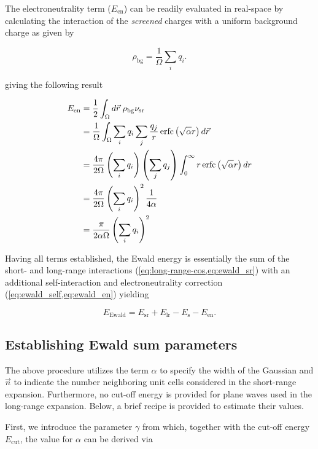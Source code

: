 The electroneutrality term ($E_{\text{en}}$) can be readily evaluated in real-space by calculating the interaction of the \textit{screened} charges with a uniform background charge as given by

\begin{equation}
    \rho_{\text{bg}} = \frac{1}{\Omega}\sum_{i} q_{i}.
\end{equation}

giving the following result

\begin{align}
    E_{\text{en}} &= \frac{1}{2} \int_{\Omega} d\vec{r} \; \rho_{\text{bg}} \nu_{\text{sr}} \\
    &= \frac{1}{\Omega} \int_{\Omega} \sum_{i}q_{i} \sum_{j} \frac{q_{j}}{r} \operatorname{erfc} \left( \sqrt{\alpha} r \right) d\vec{r} \\
    &= \frac{4 \pi}{2\Omega} \left(\sum_{i}q_{i}\right) \left(\sum_{j}q_{j}\right) \int_{0}^{\infty} r \operatorname{erfc} \left( \sqrt{\alpha} r \right) dr \\
    &= \frac{4 \pi}{2\Omega} \left(\sum_{i}q_{i}\right)^{2} \frac{1}{4\alpha} \\
    &= \frac{\pi}{2 \alpha \Omega} \left(\sum_{i} q_{i} \right)^{2}
    \label{eq:ewald_en}
\end{align}

Having all terms established, the Ewald energy is essentially the sum of the short- and long-range interactions (\cref{eq:long-range-cos,eq:ewald_sr}) with an additional self-interaction and electroneutrality correction (\cref{eq:ewald_self,eq:ewald_en}) yielding

\begin{equation}
    E_{\text{Ewald}} = E_{\text{sr}} + E_{\text{lr}} - E_{\text{s}} - E_{\text{en}}.
\end{equation}

%
%
%
\subsection{Establishing Ewald sum parameters}
\label{sec:est_ewald}

The above procedure utilizes the term $\alpha$ to specify the width of the Gaussian and $\vec{n}$ to indicate the number neighboring unit cells considered in the short-range expansion. Furthermore, no cut-off energy is provided for plane waves used in the long-range expansion. Below, a brief recipe is provided to estimate their values.\cite{2002:kustepeli}

First, we introduce the parameter $\gamma$ from which, together with the cut-off energy $E_{\text{cut}}$, the value for $\alpha$ can be derived via

